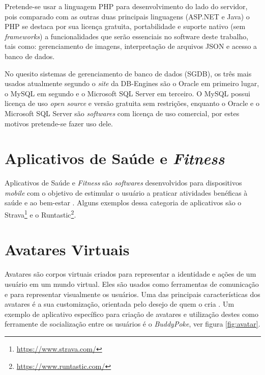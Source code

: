 Pretende-se usar a linguagem PHP para desenvolvimento do lado do servidor, pois comparado com as outras duas principais linguagens (ASP.NET e Java) o PHP se destaca por sua licença gratuita, portabilidade e suporte nativo (sem \textit{frameworks}) a funcionalidades que serão essenciais no software deste trabalho, tais como: gerenciamento de imagens, interpretação de arquivos JSON e acesso a banco de dados. \par

No quesito sistemas de gerenciamento de banco de dados (SGDB), os três mais usados atualmente segundo o \textit{site} da DB-Engines são o Oracle em primeiro lugar, o MySQL em segundo e o Microsoft SQL Server em terceiro. O MySQL possui licença de uso \textit{open source} e versão gratuita sem restrições, enquanto o Oracle e o Microsoft SQL Server são \textit{softwares} com licença de uso comercial, por estes motivos pretende-se fazer uso dele. \par

\section{Aplicativos de Saúde e \textit{Fitness}}
Aplicativos de Saúde e \textit{Fitness} são \textit{softwares} desenvolvidos para dispositivos \textit{mobile} com o objetivo de estimular o usuário a praticar atividades benéficas à saúde e ao bem-estar \cite{bonome2012}. Alguns exemplos dessa categoria de aplicativos são o Strava\footnote{\url{https://www.strava.com/}} e o  Runtastic\footnote{\url{https://www.runtastic.com/}}. \par

\section{Avatares Virtuais}
Avatares são corpos virtuais criados para representar a identidade e ações de um usuário em um mundo virtual. Eles são usados como ferramentas de comunicação e para representar visualmente os usuários. Uma das principais características dos avatares é a sua customização, orientada pelo desejo de quem o cria \cite{ducheneaut2009}. Um exemplo de aplicativo específico para criação de avatares e utilização destes como ferramente de socialização entre os usuários é o \textit{BuddyPoke}, ver figura \ref{fig:avatar}. \par

